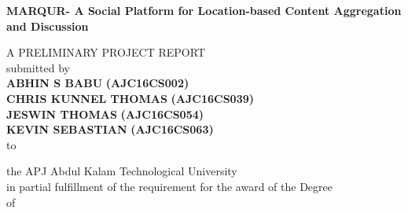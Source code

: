 \begin{titlepage}
\newpage
\begin{center}
{\Large\textbf{MARQUR- A Social Platform for Location-based Content Aggregation and Discussion }}\\
\end{center}
\vspace{0.2cm}
\begin{center} 
\normalsize{A PRELIMINARY PROJECT REPORT} \\
\vspace{0.2cm}
submitted by\\
\vspace{0.5cm}
{\large\textbf{ABHIN S BABU}}
\textbf{(AJC16CS002)}\\
{\large\textbf{CHRIS KUNNEL THOMAS}}
\textbf{(AJC16CS039)}\\
{\large\textbf{JESWIN THOMAS}}
\textbf{(AJC16CS054)}\\
{\large\textbf{KEVIN SEBASTIAN}}
\textbf{(AJC16CS063)}\\
\vspace{0.2cm}
to
\vspace{0.2cm}
\end{center} 
\begin{center}
the APJ Abdul Kalam Technological University\\
in partial fulfillment of the requirement for the award of the Degree
\\
\vspace{0.5cm}
of\\
\vspace{0.5cm}


\end{center}
\end{titlepage}
